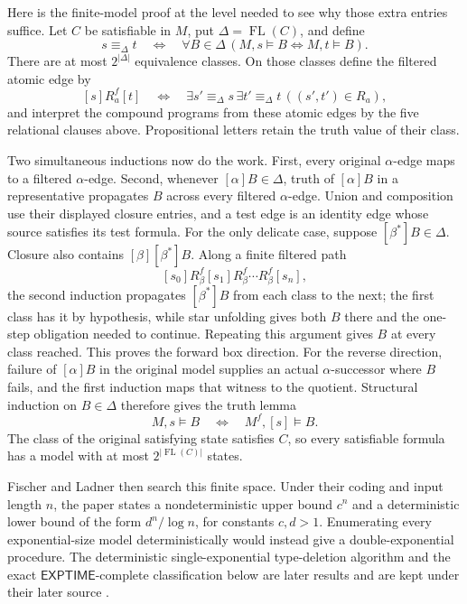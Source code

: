 Here is the finite-model proof at the level needed to see why those extra
entries suffice.  Let \(C\) be satisfiable in \(M\), put
\(\Delta=\operatorname{FL}(C)\), and define
\[
 s\equiv_{\Delta}t
 \quad\Longleftrightarrow\quad
 \forall B\in\Delta\,
   (M,s\models B\Longleftrightarrow M,t\models B).
\]
There are at most \(2^{|\Delta|}\) equivalence classes.  On those classes define
the filtered atomic edge by
\[
 [s]R_a^{f}[t]
 \quad\Longleftrightarrow\quad
 \exists s'\equiv_{\Delta}s\,
 \exists t'\equiv_{\Delta}t\,((s',t')\in R_a),
\]
and interpret the compound programs from these atomic edges by the five
relational clauses above.  Propositional letters retain the truth value of
their class.

Two simultaneous inductions now do the work.  First, every original
\(\alpha\)-edge maps to a filtered \(\alpha\)-edge.  Second, whenever
\([\alpha]B\in\Delta\), truth of \([\alpha]B\) in a representative propagates
\(B\) across every filtered \(\alpha\)-edge.  Union and composition use their
displayed closure entries, and a test edge is an identity edge whose source
satisfies its test formula.  For the only delicate case, suppose
\([\beta^{*}]B\in\Delta\).  Closure also contains
\([\beta][\beta^{*}]B\).  Along a finite filtered path
\[
 [s_0]R_\beta^{f}[s_1]R_\beta^{f}\cdots R_\beta^{f}[s_n],
\]
the second induction propagates \([\beta^{*}]B\) from each class to the next;
the first class has it by hypothesis, while star unfolding gives both \(B\)
there and the one-step obligation needed to continue.  Repeating this argument
gives \(B\) at every class reached.  This proves the forward box direction.  For the reverse
direction, failure of \([\alpha]B\) in the original model supplies an actual
\(\alpha\)-successor where \(B\) fails, and the first induction maps that
witness to the quotient.  Structural induction on \(B\in\Delta\) therefore
gives the truth lemma
\[
 M,s\models B
 \quad\Longleftrightarrow\quad
 M^{f},[s]\models B.
\]
The class of the original satisfying state satisfies \(C\), so every
satisfiable formula has a model with at most
\(2^{|\operatorname{FL}(C)|}\) states.

Fischer and Ladner then search this finite space.  Under their coding and input
length \(n\), the paper states a nondeterministic upper bound \(c^n\) and a
deterministic lower bound of the form \(d^n/\log n\), for constants
\(c,d>1\).  Enumerating every exponential-size model deterministically would
instead give a double-exponential procedure.  The deterministic
single-exponential type-deletion algorithm and the exact
\(\mathsf{EXPTIME}\)-complete classification below are later results and are
kept under their later source \cite[pp.~199--211]{FischerLadner1979}.

